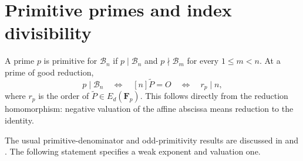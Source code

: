\documentclass[11pt,a4paper]{article}
\begin{document}
\section{Primitive primes and index divisibility}

A prime $p$ is primitive for $\mathcal B_n$ if $p\mid \mathcal B_n$ and
$p\nmid \mathcal B_m$ for every $1\le m<n$. At a prime of good reduction,
\begin{equation}\label{eq:order}
 p\mid \mathcal B_n\quad\Longleftrightarrow\quad [n]\widetilde P=O
                    \quad\Longleftrightarrow\quad r_p\mid n,
\end{equation}
where $r_p$ is the order of $\widetilde P\in E_d(\mathbf F_p)$.
This follows directly from the reduction homomorphism: negative
valuation of the affine abscissa means reduction to the identity.

The usual primitive-denominator and odd-primitivity results are
discussed in \cite[Lemmas 9 and 13]{Silverman} and
\cite[Proposition 3.10 and the following remarks]{CZ}.
The following statement specifies a weak exponent and valuation one.
\end{document}
